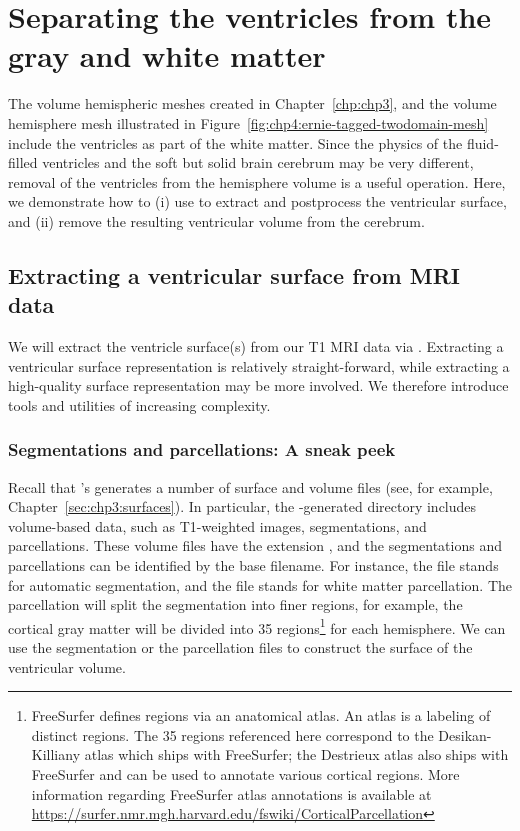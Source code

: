 \section{Separating the ventricles from the gray and white matter}
\label{sec:chp4:tools:remove-vent}

The volume hemispheric meshes created in Chapter~\ref{chp:chp3}, and the
volume hemisphere mesh illustrated in 
Figure~\ref{fig:chp4:ernie-tagged-twodomain-mesh} include the
ventricles as part of the white matter. Since the physics of the
fluid-filled ventricles and the soft but solid brain cerebrum may be
very different, removal of the ventricles from the hemisphere volume
is a useful operation. Here, we demonstrate how to (i) use
{\freesurfer} to extract and postprocess the ventricular surface, and
(ii) remove the resulting ventricular volume from the cerebrum.

\subsection{Extracting a ventricular surface from MRI data}
\label{sec:chp4:tools:remove-vent:extraction}  

We will extract the ventricle surface(s) from our T1 MRI data via
{\freesurfer}. Extracting a ventricular surface representation is
relatively straight-forward, while extracting a high-quality surface
representation may be more involved. We therefore introduce tools and
utilities of increasing complexity.

\subsubsection*{Segmentations and parcellations: A sneak peek}
 
 Recall that \freesurfer's
 generates a number of surface and volume files (see,
for example, Chapter~\ref{sec:chp3:surfaces}). In particular, the
\freesurfer{}-generated  directory includes volume-based
data, such as T1-weighted images, segmentations, and
parcellations. These volume files have the extension , and
the segmentations and parcellations can be identified by the base
filename. For instance, the file  stands for automatic
segmentation, and the file  stands for white matter
parcellation. The parcellation will split the segmentation into finer
regions, for example, the cortical gray matter will be divided into 35
regions\footnote{FreeSurfer defines regions via an anatomical atlas.  An 
atlas is a labeling of distinct regions.  The 35 regions referenced here 
correspond to the Desikan-Killiany atlas which ships with FreeSurfer; 
the Destrieux atlas also ships with FreeSurfer and can be used to annotate 
various cortical regions.  More information regarding FreeSurfer atlas 
annotations is available at 
\url{https://surfer.nmr.mgh.harvard.edu/fswiki/CorticalParcellation}} %
for each hemisphere. We can use the segmentation or the
parcellation files to construct the surface of the ventricular volume.

